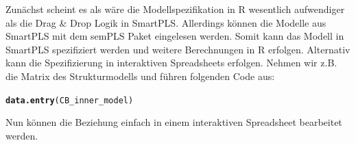 \documentclass{article}\usepackage[]{graphicx}\usepackage[]{color}
\makeatletter
\newcommand{\hlstd}[1]{\textcolor[rgb]{0.345,0.345,0.345}{#1}}%
\newcommand{\hlkwd}[1]{\textcolor[rgb]{0.737,0.353,0.396}{\textbf{#1}}}%
\newenvironment{kframe}{%
 \def\at@end@of@kframe{}%
 \ifinner\ifhmode%
  \def\at@end@of@kframe{\end{minipage}}%
  \begin{minipage}{\columnwidth}%
 \fi\fi%
 \def\FrameCommand##1{\hskip\@totalleftmargin \hskip-\fboxsep
 \colorbox{shadecolor}{##1}\hskip-\fboxsep
     \hskip-\linewidth \hskip-\@totalleftmargin \hskip\columnwidth}%
 \MakeFramed {\advance\hsize-\width
   \@totalleftmargin\z@ \linewidth\hsize
   \@setminipage}}%
 {\par\unskip\endMakeFramed%
 \at@end@of@kframe}
\newenvironment{knitrout}{}{} %
\makeatother
\begin{document}
Zunächst scheint es als wäre die Modellspezifikation in R wesentlich aufwendiger als die Drag \& Drop Logik in SmartPLS. Allerdings können die Modelle aus SmartPLS mit dem semPLS Paket eingelesen werden. Somit kann das Modell in SmartPLS spezifiziert werden und weitere Berechnungen in R erfolgen. Alternativ kann die Spezifizierung in interaktiven Spreadsheets erfolgen. Nehmen wir z.B. die Matrix des Strukturmodells und führen folgenden Code aus:
\begin{knitrout}
\color{fgcolor}\begin{kframe}
\begin{alltt}
\hlkwd{data.entry}\hlstd{(CB_inner_model)}
\end{alltt}
\end{kframe}
\end{knitrout}
Nun können die Beziehung einfach in einem interaktiven Spreadsheet bearbeitet werden.\\
\end{document}
